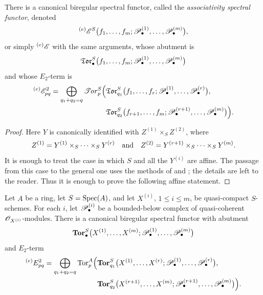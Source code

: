 \begin{proposition}[6.8.2]
\label{III.6.8.2}
There is a canonical biregular spectral functor, called the
\emph{associativity spectral functor}, denoted
\[
  {}^{(e)}\mathscr{E}^S
  \bigl(
    f_1,\ldots,f_m;
    \mathscr{P}_\bullet^{(1)},\ldots,\mathscr{P}_\bullet^{(m)}
  \bigr),
\]
or simply ${}^{(e)}\mathscr{E}$ with the same arguments, whose abutment
is
\[
  \mathfrak{Tor}_\bullet^S
  \bigl(
    f_1,\ldots,f_m;
    \mathscr{P}_\bullet^{(1)},\ldots,\mathscr{P}_\bullet^{(m)}
  \bigr)
\]
and whose $E_2$-term is
\[
\begin{split}
  {}^{(e)}\mathscr{E}_{pq}^2
  =
  \bigoplus_{q_1+q_2=q}
  \mathscr{T}\!\mathit{or}_p^S
  \Bigl(
    &
    \mathfrak{Tor}_{q_1}^S
    \bigl(
      f_1,\ldots,f_r;
      \mathscr{P}_\bullet^{(1)},\ldots,\mathscr{P}_\bullet^{(r)}
    \bigr),
    \\
    &
    \mathfrak{Tor}_{q_2}^S
    \bigl(
      f_{r+1},\ldots,f_m;
      \mathscr{P}_\bullet^{(r+1)},\ldots,\mathscr{P}_\bullet^{(m)}
    \bigr)
  \Bigr).
\end{split}
\]
\end{proposition}

\begin{proof}
Here $Y$ is canonically identified with
$Z^{(1)}\times_SZ^{(2)}$, where
\[
  Z^{(1)}
  =
  Y^{(1)}\times_S\cdots\times_SY^{(r)}
  \quad\hbox{and}\quad
  Z^{(2)}
  =
  Y^{(r+1)}\times_S\cdots\times_SY^{(m)}.
\]
It is enough to treat the case in which $S$ and all the
$Y^{(i)}$ are affine.  The passage from this case to the general
one uses the methods of  and
; the details are left to the reader.  Thus it is
enough to prove the following affine statement.
\end{proof}

\begin{corollary}[6.8.3]
\label{III.6.8.3}
Let $A$ be a ring, let $S=\operatorname{Spec}(A)$, and let $X^{(i)}$,
$1\leq i\leq m$, be quasi-compact $S$-schemes.  For each $i$, let
$\mathscr{P}_\bullet^{(i)}$ be a bounded-below complex of
quasi-coherent $\mathscr{O}_{X^{(i)}}$-modules.  There is a canonical
biregular spectral functor with abutment
\[
  \mathbf{Tor}_\bullet^S
  \bigl(
    X^{(1)},\ldots,X^{(m)};
    \mathscr{P}_\bullet^{(1)},\ldots,\mathscr{P}_\bullet^{(m)}
  \bigr)
\]
and $E_2$-term
\[
\begin{split}
  {}^{(e)}E_{pq}^2
  =
  \bigoplus_{q_1+q_2=q}
  \operatorname{Tor}_p^A
  \Bigl(
    &
    \mathbf{Tor}_{q_1}^S
    \bigl(
      X^{(1)},\ldots,X^{(r)};
      \mathscr{P}_\bullet^{(1)},\ldots,\mathscr{P}_\bullet^{(r)}
    \bigr),
    \\
    &
    \mathbf{Tor}_{q_2}^S
    \bigl(
      X^{(r+1)},\ldots,X^{(m)};
      \mathscr{P}_\bullet^{(r+1)},\ldots,\mathscr{P}_\bullet^{(m)}
    \bigr)
  \Bigr).
\end{split}
\]
\end{corollary}

